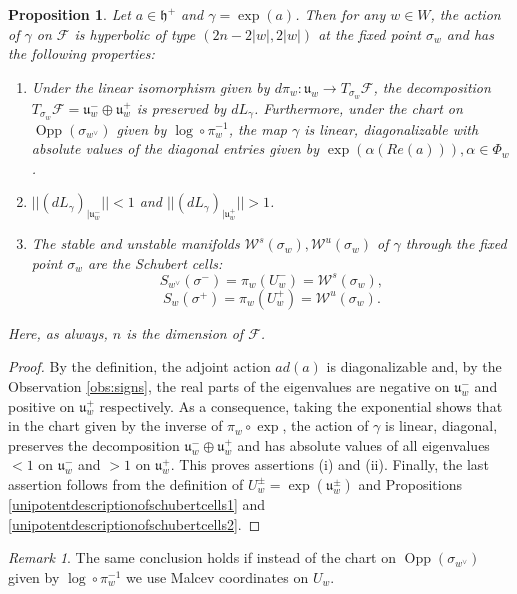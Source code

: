 \documentclass[12pt]{amsbook}%
\newtheorem{prop}[thm]{Proposition}
\theoremstyle{definition}
\theoremstyle{remark}
\newtheorem{rem}[thm]{Remark}
\numberwithin{section}{chapter}
\numberwithin{subsection}{section}
\numberwithin{figure}{chapter}
\DeclareMathOperator{\Opp}{Opp}
\def\cF{{\mathscr{F}}}
\def\ga{\gamma}
\def\al{\alpha}
\begin{document}
{{\begin{prop} \label{prop_hyperbolic_torus_action} Let $a \in \mathfrak{h}^+$ and $\gamma = \exp(a)$. 
Then for any $w \in W$, the action of $\gamma$ on $\cF$ is hyperbolic of type 
$(2n - 2\vert w \vert , 2\vert w \vert )$ at the fixed point $\sigma_w$ and has the following properties: 
\begin{enumerate}
\item[(i)] Under the linear isomorphism given by $d\pi_w  : \mathfrak{u}_w \to T_{\sigma_w} \cF$, the decomposition $T_{\sigma_w} \cF =  \mathfrak{u}_w^- \oplus \mathfrak{u}_w^+ $ is preserved by $dL_\gamma$. Furthermore, under the chart on $\Opp(\sigma_{w^\vee})$ given by $\log\circ \pi_w^{-1}$, the map 
$\ga$ is linear, diagonalizable with absolute values of the diagonal entries given by $\exp(\al(Re(a))), \al\in \Phi_w$.  
\item[(ii)] $||(d L_\gamma)_{|\mathfrak{u}_w^- }|| < 1$ and $||(d L_\gamma)_{|\mathfrak{u}_w^+ }|| > 1$.
\item[(iii)] The stable and unstable manifolds $ \mathcal{W}^s(\sigma_w), \mathcal{W}^u(\sigma_w)$ 
of $\ga$ through the fixed point $\sigma_w$ are the Schubert cells: 
$$
S_{w^\vee}(\sigma^-)=\pi_w(U_w^-) = \mathcal{W}^s(\sigma_w),$$
$$ 
S_{w}(\sigma^+)=\pi_w(U_w^+) = \mathcal{W}^u(\sigma_w).$$
\end{enumerate} 
Here, as always, $n$ is the dimension of $\cF$. 
\end{prop}
 
 \begin{proof}
 By the definition, the adjoint action $ad(a)$ is diagonalizable and, by the Observation \ref{obs:signs}, 
 the real parts of the eigenvalues are negative on $\mathfrak{u}_w^-$ and positive on $\mathfrak{u}_w^+$ respectively. 
 As a consequence, taking the exponential shows that in the chart given by the inverse of  $\pi_w \circ \exp$, the action of $\gamma$ is linear, diagonal, preserves the decomposition $\mathfrak{u}_w^-\oplus \mathfrak{u}_w^+$ 
  and has absolute values of all eigenvalues $<1$ on $\mathfrak{u}_w^-$ and $>1$ on $\mathfrak{u}_w^+$. This proves assertions (i) and (ii). 
 Finally, the last assertion follows from the definition of $U_w^\pm = \exp(\mathfrak{u}_w^\pm)$ and 
 Propositions \ref{unipotentdescriptionofschubertcells1} and \ref{unipotentdescriptionofschubertcells2}.   
 \end{proof}


\begin{rem}
The same conclusion holds if instead of the chart on $\Opp(\sigma_{w^\vee})$ given by $\log\circ \pi_w^{-1}$ we use Malcev coordinates on $U_w$.  
\end{rem}

}}
\end{document}
